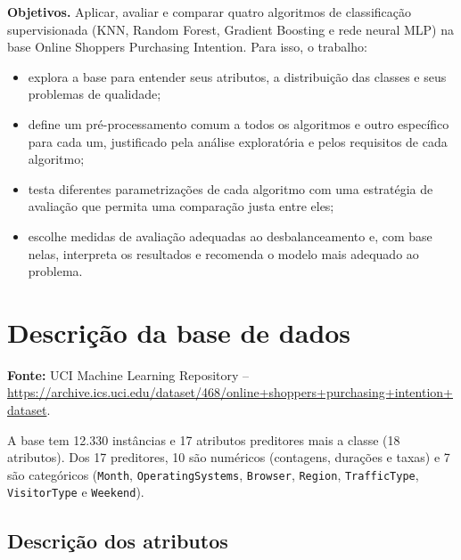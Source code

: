 \documentclass[11pt,a4paper]{article}
\DeclareRobustCommand{\atr}[1]{{\renewcommand{\_}{\textunderscore\allowbreak}\texttt{#1}}}
\begin{document}
\textbf{Objetivos.} Aplicar, avaliar e comparar quatro algoritmos de classificação supervisionada (KNN, Random Forest,
Gradient Boosting e rede neural MLP) na base Online Shoppers Purchasing Intention. Para isso, o trabalho:
\begin{itemize}
  \item explora a base para entender seus atributos, a distribuição das classes e seus problemas de qualidade;
  \item define um pré-processamento comum a todos os algoritmos e outro específico para cada um, justificado pela
        análise exploratória e pelos requisitos de cada algoritmo;
  \item testa diferentes parametrizações de cada algoritmo com uma estratégia de avaliação que permita uma
        comparação justa entre eles;
  \item escolhe medidas de avaliação adequadas ao desbalanceamento e, com base nelas, interpreta os resultados e
        recomenda o modelo mais adequado ao problema.
\end{itemize}

\section{Descrição da base de dados}

\textbf{Fonte:} UCI Machine Learning Repository --
\url{https://archive.ics.uci.edu/dataset/468/online+shoppers+purchasing+intention+dataset}.

A base tem 12.330 instâncias e 17 atributos preditores mais a classe (18 atributos). Dos 17 preditores, 10 são
numéricos (contagens, durações e taxas) e 7 são categóricos (\atr{Month}, \atr{OperatingSystems}, \atr{Browser},
\atr{Region}, \atr{TrafficType}, \atr{VisitorType} e \atr{Weekend}).

\subsection*{Descrição dos atributos}
\end{document}

